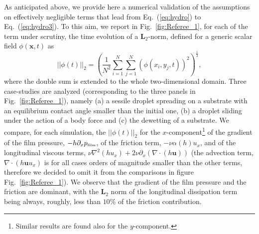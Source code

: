 As anticipated above, we provide here a numerical validation of the assumptions on effectively negligible terms that lead from Eq.~(\ref{eq:hydro}) to Eq.~(\ref{eq:hydro3}). 
To this aim, we report in Fig.~\ref{fig:Referee_1}, for each of the term under scrutiny, the time evolution of a $\mathbf{L}_2$-norm, defined for a generic scalar field $\phi(\mathbf{x},t)$ as 
\begin{equation}\label{eq:magnitude}
  ||\phi(t)||_2 = \left(\frac{1}{N^2}\sum_{i=1}^{N}\sum_{j=1}^{N}\left(\phi(x_i,y_j,t)\right)^2\right)^{\frac{1}{2}},
\end{equation}
where the double sum is extended to the whole two-dimensional domain. Three case-studies are analyzed (corresponding to the three panels in Fig.~\ref{fig:Referee_1}), namely (a) a sessile droplet spreading on a substrate with an equilibrium contact angle smaller than the initial one, (b) a droplet sliding under the action of a body force and (c) the dewetting of a substrate. 
We compare, for each simulation, the $||\phi(t)||_2$ for the $x$-component\footnote{Similar results are found also for the $y$-component.} of the gradient of the film pressure, $-h\partial_x p_{\mbox{\tiny{film}}}$, of the friction term, $-\nu \alpha(h) u_x$, and of the longitudinal viscous terms, $\nu \nabla^2 (h u_x) + 2\nu \partial_x (\nabla \cdot (h\mathbf{u}))$ (the advection term, $\nabla \cdot (h \mathbf{u}u_x)$ is for all cases orders of magnitude smaller than the other terms, therefore we decided to omit it from the comparisons in figure Fig.~\ref{fig:Referee_1}).
We observe that the gradient of the film pressure and the friction are dominant, with the $\mathbf{L}_2$ norm of the longitudinal dissipation term being always, roughly, less than $10\%$ of the friction contribution.